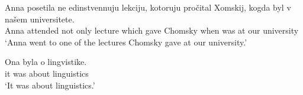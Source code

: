 \begin{exe}
	\ex \label{no-anti-unique} \begin{xlist}
		\ex \gll Anna posetila ne edinstvennuju lekciju, kotoruju pro\v{c}ital Xomskij, kogda byl v na\v{s}em universitete.\\
		Anna attended not only lecture which gave Chomsky when was at our university\\
		\glt `Anna went to one of the lectures Chomsky gave at our university.'

		\ex \gll Ona byla o lingvistike.\\
		it was about linguistics\\
		\glt `It was about linguistics.'
	\end{xlist}
\end{exe}
